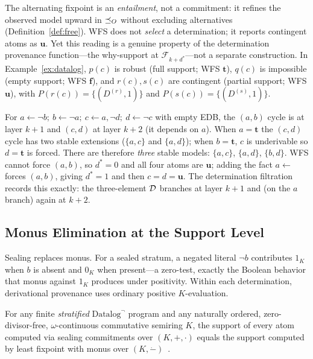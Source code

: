 \noindent
The alternating fixpoint is an \emph{entailment}, not a commitment: it refines
the observed model upward in $\preceq_O$ without excluding alternatives
(Definition~\ref{def:free}). WFS does not \emph{select} a determination; it
reports contingent atoms as $\mathbf{u}$. Yet this reading is a genuine
property of the determination provenance function---the why-support at
$\mathcal{F}_{k+d^\ast}$---not a separate construction. In
Example~\ref{ex:datalog}, $p(c)$ is robust (full support; WFS $\mathbf{t}$),
$q(c)$ is impossible (empty support; WFS $\mathbf{f}$), and $r(c), s(c)$ are
contingent (partial support; WFS $\mathbf{u}$), with
$P(r(c)) = \{(D^{(r)},1)\}$ and $P(s(c)) = \{(D^{(s)},1)\}$.

\begin{example}
  \label{ex:datalog-nested}
  For $a \leftarrow \neg b;\ b \leftarrow \neg a;\ c \leftarrow a, \neg d;\
  d \leftarrow \neg c$ with empty EDB, the $(a,b)$ cycle is at layer $k{+}1$
  and $(c,d)$ at layer $k{+}2$ (it depends on $a$). When $a = \mathbf{t}$ the
  $(c,d)$ cycle has two stable extensions ($\{a,c\}$ and $\{a,d\}$); when
  $b = \mathbf{t}$, $c$ is underivable so $d = \mathbf{t}$ is forced. There are
  therefore \emph{three} stable models: $\{a,c\}$, $\{a,d\}$, $\{b,d\}$. WFS
  cannot force $(a,b)$, so $d^\ast = 0$ and all four atoms are $\mathbf{u}$;
  adding the fact $a \leftarrow{}$ forces $(a,b)$, giving $d^\ast = 1$ and
  then $c = d = \mathbf{u}$. The determination filtration records this exactly:
  the three-element $\mathcal{D}$ branches at layer $k{+}1$ and (on the $a$ branch)
  again at $k{+}2$.
\end{example}

\subsection{Monus Elimination at the Support Level}
\label{sec:datalog-monus}

Sealing replaces monus. For a sealed stratum, a negated literal $\neg b$
contributes $1_K$ when $b$ is absent and $0_K$ when present---a zero-test,
exactly the Boolean behavior that monus against $1_K$ produces under
positivity. Within each determination, derivational provenance uses ordinary
positive $K$-evaluation.

\begin{theorem}
  \label{thm:monus-elimination}
  For any finite \emph{stratified} $\mbox{Datalog}^\neg$ program and any
  naturally ordered, zero-divisor-free, $\omega$-continuous commutative
  semiring $K$, the support of every atom computed via sealing commitments
  over $(K, +, \cdot)$ equals the support computed by least fixpoint with
  monus over $(K, \mathbin{\dot{-}})$~\cite{dannert2021semiring}.
\end{theorem}

